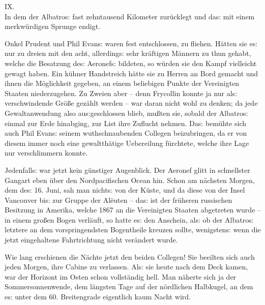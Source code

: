 \documentclass[oneside,12pt]{book}
\newenvironment{antiqua}{\normalfont}{}
\newcommand{\s}{s:}
\begin{document}
\newpage\begin{center}\label{kap09}
{\large \begin{antiqua}IX.\end{antiqua}\\
In dem der {\glqq}Albatro{\s}{\grqq} fast zehntausend Kilometer 
zur\"ucklegt und da{\s} mit einem merkw\"urdigen Sprunge
endigt.\\\bigskip}
\end{center}



Onkel Prudent und Phil Evan{\s} waren fest entschlossen, zu fliehen.
H\"atten sie e{\s} nur zu dreien mit den acht, allerding{\s} sehr
kr\"aftigen M\"annern zu thun gehabt, welche die Besatzung de{\s}
Aeronef{\s} bildeten, so w\"urden sie den Kampf vielleicht gewagt
haben. Ein k\"uhner Handstreich h\"atte sie zu Herren an Bord gemacht
und ihnen die M\"oglichkeit gegeben, an einem beliebigen Punkte der
Vereinigten Staaten niederzugehen. Zu Zweien aber -- denn Frycollin
konnte ja nur al{\s} verschwindende Gr\"o{\ss}e gez\"ahlt werden --
war daran nicht wohl zu denken; da jede Gewaltanwendung also
au{\s}geschlossen blieb, mu{\ss}ten sie, sobald der
{\glqq}Albatro{\s}{\grqq} einmal zur Erde hinabging, zur List ihre
Zuflucht nehmen. Da{\s} bem\"uhte sich auch Phil Evan{\s} seinem
wuthschnaubenden Collegen beizubringen, da er von diesem immer noch
eine gewaltth\"atige Uebereilung f\"urchtete, welche ihre Lage nur
verschlimmern konnte.

Jedenfall{\s} war jetzt kein g\"unstiger Augenblick. Der Aeronef
glitt in schnellster Gangart eben \"uber den Nordpacifischen Ocean
hin. Schon am n\"achsten Morgen, dem de{\s} 16. Juni, sah man
nicht{\s} von der K\"uste, und da diese von der Insel Vancouver
bi{\s} zur Gruppe der Al\"euten -- da{\s} ist der fr\"u\-heren
russischen Besitzung in Amerika, welche 1867 an die Vereinigten
Staaten abgetreten wurde -- in einem gro{\ss}en Bogen verl\"auft,
so hatte e{\s} den Anschein, al{\s} ob der {\glqq}Albatro{\s}{\grqq}
letztere an dem vorspringendsten Bogentheile kreuzen sollte,
wenigsten{\s} wenn die jetzt eingehaltene Fahrtrichtung nicht
ver\"andert wurde.

Wie lang erschienen die N\"achte jetzt den beiden Collegen! Sie
beeilten sich auch jeden Morgen, ihre Cabine zu verlassen. Al{\s} sie
heute nach dem Deck kamen, war der Horizont im Osten schon
vollst\"andig hell. Man n\"aherte sich ja der Sommersonnenwende, dem
l\"angsten Tage auf der n\"ordlichen Halbkugel, an dem e{\s} unter
dem 60. Breitengrade eigentlich kaum Nacht wird.
\end{document}
